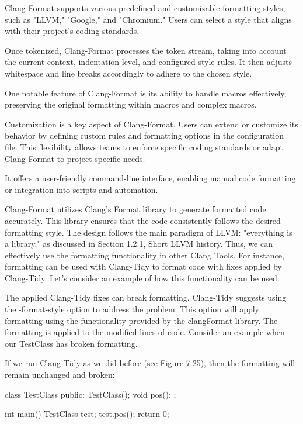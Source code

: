 Clang-Format supports various predefined and customizable formatting styles, such as "LLVM," "Google," and "Chromium." Users can select a style that aligns with their project's coding standards.

Once tokenized, Clang-Format processes the token stream, taking into account the current context, indentation level, and configured style rules. It then adjusts whitespace and line breaks accordingly to adhere to the chosen style.

One notable feature of Clang-Format is its ability to handle macros effectively, preserving the original formatting within macros and complex macros.

Customization is a key aspect of Clang-Format. Users can extend or customize its behavior by defining custom rules and formatting options in the configuration file. This flexibility allows teams to enforce specific coding standards or adapt Clang-Format to project-specific needs.

It offers a user-friendly command-line interface, enabling manual code formatting or integration into scripts and automation.

Clang-Format utilizes Clang's Format library to generate formatted code accurately. This library ensures that the code consistently follows the desired formatting style. The design follows the main paradigm of LLVM: "everything is a library," as discussed in Section 1.2.1, Short LLVM history. Thus, we can effectively use the formatting functionality in other Clang Tools. For instance, formatting can be used with Clang-Tidy to format code with fixes applied by Clang-Tidy. Let's consider an example of how this functionality can be used.


The applied Clang-Tidy fixes can break formatting. Clang-Tidy suggests using the -format-style option to address the problem. This option will apply formatting using the functionality provided by the clangFormat library. The formatting is applied to the modified lines of code. Consider an example when our TestClass has broken formatting.

If we run Clang-Tidy as we did before (see Figure 7.25), then the formatting will remain unchanged and broken:

\begin{cpp}
class TestClass {
public:
  TestClass(){};
  void pos(){};
};

int main() {
  TestClass test;
  test.pos();
  return 0;
}
\end{cpp}

